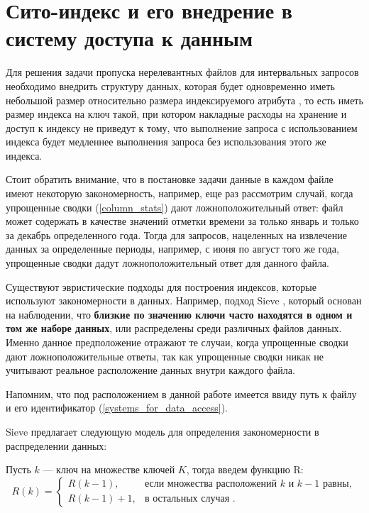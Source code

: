 \section{Сито-индекс и его внедрение в систему доступа к данным}

Для решения задачи пропуска нерелевантных файлов для интервальных запросов необходимо внедрить структуру данных, которая будет одновременно иметь небольшой размер относительно размера индексируемого атрибута , то есть иметь размер индекса на ключ  такой, при котором накладные расходы на хранение и доступ к индексу не приведут к тому, что выполнение запроса с использованием индекса будет медленнее выполнения запроса без использования этого же индекса.

Стоит обратить внимание, что в постановке задачи  данные в каждом файле имеют некоторую закономерность, например, еще раз рассмотрим случай, когда упрощенные сводки (\ref{column_stats}) дают ложноположительный ответ: файл может содержать в качестве значений отметки времени за только январь и только за декабрь определенного года. Тогда для запросов, нацеленных на извлечение данных за определенные периоды, например, с июня по август того же года, упрощенные сводки дадут ложноположительный ответ для данного файла.

Существуют эвристические подходы для построения индексов, которые используют закономерности в данных. Например, подход Sieve \cite{Sieve}, который основан на наблюдении, что \textbf{близкие по значению ключи часто находятся в одном и том же наборе данных}, или распределены среди различных файлов данных. Именно данное предположение отражают те случаи, когда упрощенные сводки дают ложноположительные ответы, так как упрощенные сводки никак не учитывают реальное расположение данных внутри каждого файла.

Напомним, что под расположением в данной работе имеется ввиду путь к файлу и его идентификатор (\ref{systems_for_data_access}).

Sieve предлагает следующую модель для определения закономерности в распределении данных:

Пусть $k$ --- ключ на множестве ключей $K$, тогда введем функцию R:
\begin{equation}\label{R_CDF}
R(k) = 
\begin{cases} 
    R(k - 1), & \text{если множества расположений $k$ и $k - 1$ равны}, \\
    R(k - 1) + 1, & \text{в остальных случая }.
\end{cases}
\end{equation}


